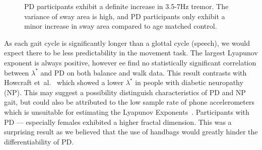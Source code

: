 \documentclass[12pt, twoside]{book}
\begin{document}
\begin{figure}[h]
\begin{subfigure}{.42\textwidth}
	\end{subfigure}
	\caption{PD participants exhibit a definite increase in 3.5-7Hz tremor. The variance of sway area is high, and PD participants only exhibit a minor increase in sway area compared to age matched control. }
	\label{basicrest}
\end{figure}




As each gait cycle is significantly longer than a glottal cycle (speech), we would expect there to be less predictability in the movement task. The largest Lyapunov exponent is always positive, however ee find no statistically significant correlation between $\lambda^*$ and PD on both balance and walk data. This result contrasts with Howcraft et~al.~\cite{howcroft2014analysisgaitlyapunov} which showed a lower $\lambda^*$ in people with diabetic neuropathy (NP). This may suggest a possibility distinguish characteristics of PD and NP gait, but could also be attributed to the low sample rate of phone accelerometers which is unsuitable for estimating the Lyapunov Exponents~\cite{rosenstein1993practicallyapunov}. Participants with PD --- especially females exhibited a higher fractal dimension. This was a surprising result as we believed that the use of handbags would greatly hinder the differentiability of PD.
\end{document}
